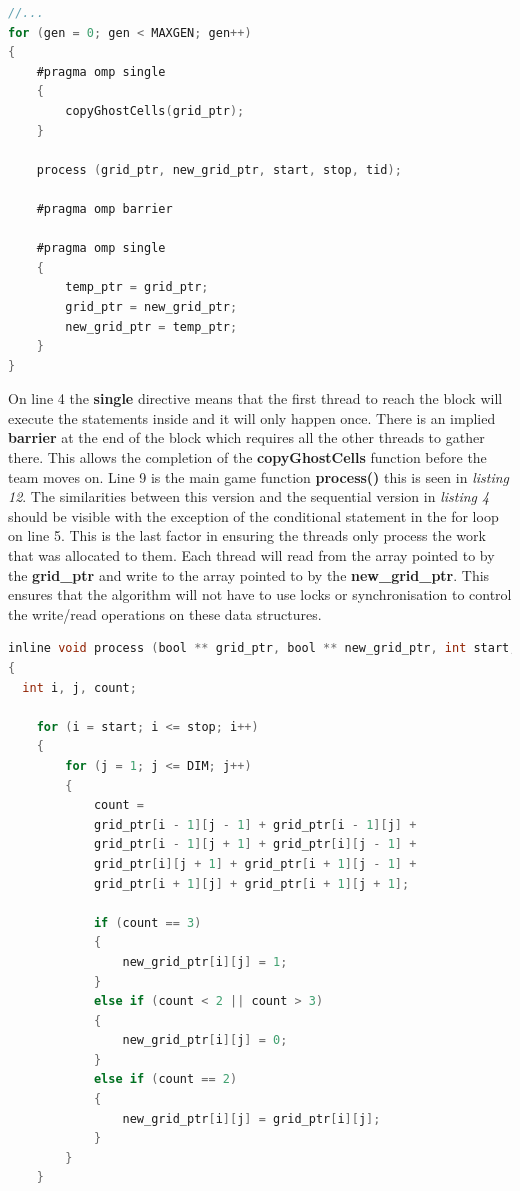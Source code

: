 \documentclass[11pt]{article} %
\begin{document}
\begin{lstlisting}[language=C, caption={OpenMP Game of Life main game loop}]
//...
for (gen = 0; gen < MAXGEN; gen++)
{
    #pragma omp single
    {
        copyGhostCells(grid_ptr);
    }
            
    process (grid_ptr, new_grid_ptr, start, stop, tid);

    #pragma omp barrier
            
    #pragma omp single
    {
        temp_ptr = grid_ptr;
        grid_ptr = new_grid_ptr;
        new_grid_ptr = temp_ptr;
    }
}
\end{lstlisting}
On line 4 the {\bf single} directive means that the first thread to reach the block will execute the statements inside and it will only happen once. There is an implied {\bf barrier} at the end of the block which requires all the other threads to gather there. This allows the completion of the {\bf copyGhostCells} function before the team moves on. Line 9 is the main game function {\bf process()} this is seen in {\it listing 12}. The similarities between this version and the sequential version in {\it listing 4} should be visible with the exception of the conditional statement in the for loop on line 5. This is the last factor in ensuring the threads only process the work that was allocated to them. Each thread will read from the array pointed to by the {\bf grid\_ptr} and write to the array pointed to by the {\bf new\_grid\_ptr}. This ensures that the algorithm will not have to use locks or synchronisation to control the write/read operations on these data structures.
\begin{lstlisting}[language=C, caption={OpenMP Process chunk and calculate moore-neighbourhood}]
inline void process (bool ** grid_ptr, bool ** new_grid_ptr, int start, int stop, int tid)
{
  int i, j, count;

    for (i = start; i <= stop; i++)
    {
        for (j = 1; j <= DIM; j++)
        {
            count =
            grid_ptr[i - 1][j - 1] + grid_ptr[i - 1][j] +
            grid_ptr[i - 1][j + 1] + grid_ptr[i][j - 1] +
            grid_ptr[i][j + 1] + grid_ptr[i + 1][j - 1] +
            grid_ptr[i + 1][j] + grid_ptr[i + 1][j + 1];

            if (count == 3)
            {
                new_grid_ptr[i][j] = 1;
            }
            else if (count < 2 || count > 3)
            {
                new_grid_ptr[i][j] = 0;
            }
            else if (count == 2)
            {
                new_grid_ptr[i][j] = grid_ptr[i][j];
            }
        }
    }
\end{lstlisting}
\end{document}
